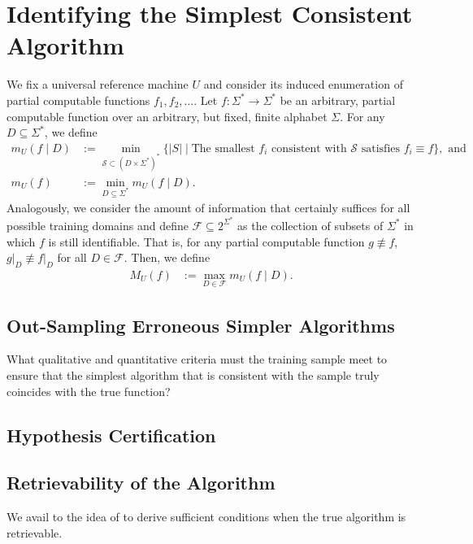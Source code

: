 
\chapter{Identifying the Simplest Consistent Algorithm}
We fix a universal reference machine $U$ and consider its induced enumeration of partial computable functions $f_1,f_2,\dots$.
Let $f:\Sigma^{*}\to\Sigma^{*}$ be an arbitrary, partial computable function over an arbitrary, but fixed, finite alphabet $\Sigma$.
For any $D\subseteq \Sigma^{*}$, we define
\begin{align}
	m_U(f\mid D)&:=\min_{\mathcal{S}\subset (D\times \Sigma^{*})^{*}}\{|S|\mid \text{The smallest } f_i \text{ consistent with } \mathcal{S} \text{ satisfies } f_i\equiv f\}, \text{ and}\\
	m_U(f)&:= \min_{D\subseteq \Sigma^{*}} m_U(f\mid D).
\end{align}
Analogously, we consider the amount of information that certainly suffices for all possible training domains and define $\mathcal{F}\subseteq 2^{\Sigma^{*}}$ as the collection of subsets of $\Sigma^{*}$ in which $f$ is still identifiable. That is, for any partial computable function $g\not\equiv f$, $g\lvert_D\not\equiv f\lvert_D$ for all $D\in \mathcal{F}$. Then, we define
\begin{align}
	M_U(f)&:= \max_{D\in\mathcal{F}} m_U(f\mid D).
\end{align}
\section{Out-Sampling Erroneous Simpler Algorithms}
What qualitative and quantitative criteria must the training sample meet to ensure that the simplest algorithm that is consistent with the sample truly coincides with the true function?

\section{Hypothesis Certification}

\section{Retrievability of the Algorithm}
We avail to the idea of \cite{richens2024robust} to derive sufficient conditions when the true algorithm is retrievable.
